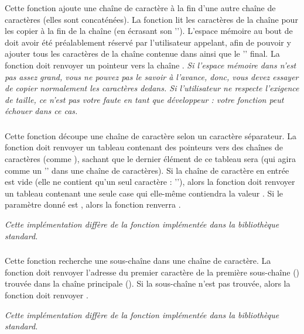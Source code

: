 \noindent Cette fonction ajoute une chaîne de caractère à la fin d'une autre chaîne de caractères (elles sont concaténées).
La fonction lit les caractères de la chaîne  pour les copier à la fin de la chaîne  (en écrasant son '').
L'espace mémoire au bout de  doit avoir été préalablement réservé par l'utilisateur appelant, afin de pouvoir y ajouter tous les caractères de la chaîne contenue dans  ainsi que le '' final.
La fonction doit renvoyer un pointeur vers la chaîne .
\textit{Si l'espace mémoire dans  n'est pas assez grand, vous ne pouvez pas le savoir à l'avance, donc, vous devez essayer de copier normalement les caractères dedans. Si l'utilisateur ne respecte l'exigence de taille, ce n'est pas votre faute en tant que développeur : votre fonction peut échouer dans ce cas.}


\subsubsection*{}

\noindent Cette fonction découpe une chaîne de caractère selon un caractère séparateur.
La fonction doit renvoyer un tableau contenant des pointeurs vers des chaînes de caractères (comme ), sachant que le dernier élément de ce tableau sera  (qui agira comme un '' dans une chaîne de caractères).
Si la chaîne de caractère en entrée est vide (elle ne contient qu'un seul caractère : ''), alors la fonction doit renvoyer un tableau contenant une seule case qui elle-même contiendra la valeur .
Si le paramètre donné est , alors la fonction renverra .

\noindent \textit{Cette implémentation diffère de la fonction  implémentée dans la bibliothèque standard.}


\subsubsection*{}

\noindent Cette fonction recherche une sous-chaîne dans une chaîne de caractère.
La fonction doit renvoyer l'adresse du premier caractère de la première sous-chaîne () trouvée dans la chaîne principale ().
Si la sous-chaîne n'est pas trouvée, alors la fonction doit renvoyer .

\noindent \textit{Cette implémentation diffère de la fonction  implémentée dans la bibliothèque standard.}
